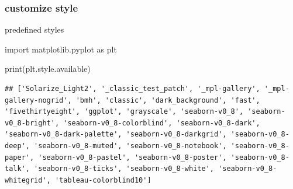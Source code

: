 \documentclass[
]{book}
\newenvironment{Shaded}{\begin{snugshade}}{\end{snugshade}}
\newcommand{\BuiltInTok}[1]{#1}
\newcommand{\ImportTok}[1]{#1}
\newcommand{\NormalTok}[1]{#1}
\theoremstyle{definition}
\theoremstyle{definition}
\theoremstyle{definition}
\theoremstyle{definition}
\theoremstyle{remark}
\begin{document}
\hypertarget{customize-style}{%
\subsubsection{customize style}\label{customize-style}}

predefined styles

\begin{Shaded}
\begin{Highlighting}[]
\ImportTok{import}\NormalTok{ matplotlib.pyplot }\ImportTok{as}\NormalTok{ plt}

\BuiltInTok{print}\NormalTok{(plt.style.available)}
\end{Highlighting}
\end{Shaded}

\begin{verbatim}
## ['Solarize_Light2', '_classic_test_patch', '_mpl-gallery', '_mpl-gallery-nogrid', 'bmh', 'classic', 'dark_background', 'fast', 'fivethirtyeight', 'ggplot', 'grayscale', 'seaborn-v0_8', 'seaborn-v0_8-bright', 'seaborn-v0_8-colorblind', 'seaborn-v0_8-dark', 'seaborn-v0_8-dark-palette', 'seaborn-v0_8-darkgrid', 'seaborn-v0_8-deep', 'seaborn-v0_8-muted', 'seaborn-v0_8-notebook', 'seaborn-v0_8-paper', 'seaborn-v0_8-pastel', 'seaborn-v0_8-poster', 'seaborn-v0_8-talk', 'seaborn-v0_8-ticks', 'seaborn-v0_8-white', 'seaborn-v0_8-whitegrid', 'tableau-colorblind10']
\end{verbatim}
\end{document}
